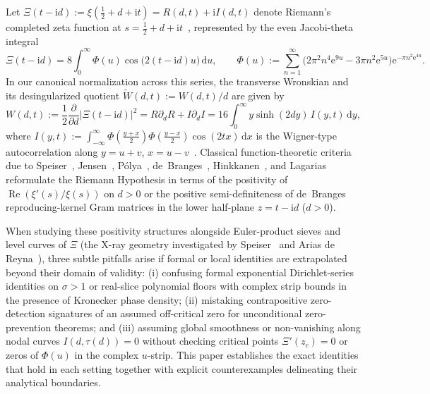 \documentclass[11pt,reqno]{amsart}
\theoremstyle{plain}
\theoremstyle{definition}
\theoremstyle{remark}
\numberwithin{equation}{section}
\newcommand{\dd}{\,\mathrm{d}}
\newcommand{\ii}{\mathrm{i}}
\newcommand{\ee}{\mathrm{e}}
\DeclareMathOperator{\Reop}{Re}
\begin{document}
Let $\Xi(t - \ii d) := \xi(\frac{1}{2} + d + \ii t) = R(d,t) + \ii I(d,t)$ denote Riemann's completed zeta function at $s = \frac{1}{2} + d + \ii t$~\cite{riemann1859,titchmarsh1986}, represented by the even Jacobi-theta integral
\begin{equation}\label{eq:xi_def}
\Xi(t - \ii d) = 8\int_0^{\infty} \Phi(u)\cos\!\bigl(2(t - \ii d)u\bigr)\dd u, \qquad \Phi(u) := \sum_{n=1}^{\infty} \bigl(2\pi^2 n^4\ee^{9u} - 3\pi n^2\ee^{5u}\bigr)\ee^{-\pi n^2\ee^{4u}}.
\end{equation}
In our canonical normalization across this series, the transverse Wronskian and its desingularized quotient $\widetilde{W}(d,t) := W(d,t)/d$ are given by
\begin{equation}\label{eq:canonical_W}
W(d,t) := \frac{1}{2}\frac{\partial}{\partial d}\bigl\lvert\Xi(t - \ii d)\bigr\rvert^2 = R\partial_d R + I\partial_d I = 16\int_0^{\infty} y\sinh(2dy)\,I(y,t)\dd y,
\end{equation}
where $I(y,t) := \int_{-\infty}^{\infty}\Phi(\frac{y+x}{2})\Phi(\frac{y-x}{2})\cos(2tx)\dd x$ is the Wigner-type autocorrelation along $y = u + v$, $x = u - v$~\cite{wigner1932,hudson1974}. Classical function-theoretic criteria due to Speiser~\cite{speiser1934}, Jensen~\cite{jensen1913}, P\'olya~\cite{polya1926}, de~Branges~\cite{debranges1968}, Hinkkanen~\cite{hinkkanen1997}, and Lagarias~\cite{lagarias1999} reformulate the Riemann Hypothesis in terms of the positivity of $\Reop(\xi'(s)/\xi(s))$ on $d > 0$ or the positive semi-definiteness of de~Branges reproducing-kernel Gram matrices in the lower half-plane $z = t - \ii d$ ($d > 0$).

When studying these positivity structures alongside Euler-product sieves and level curves of $\Xi$ (the X-ray geometry investigated by Speiser~\cite{speiser1934} and Arias de Reyna~\cite{ariasdereyna2003}), three subtle pitfalls arise if formal or local identities are extrapolated beyond their domain of validity: (i) confusing formal exponential Dirichlet-series identities on $\sigma > 1$ or real-slice polynomial floors with complex strip bounds in the presence of Kronecker phase density; (ii) mistaking contrapositive zero-detection signatures of an assumed off-critical zero for unconditional zero-prevention theorems; and (iii) assuming global smoothness or non-vanishing along nodal curves $I(d,\tau(d)) = 0$ without checking critical points $\Xi'(z_c) = 0$ or zeros of $\Phi(u)$ in the complex $u$-strip. This paper establishes the exact identities that hold in each setting together with explicit counterexamples delineating their analytical boundaries.
\end{document}
